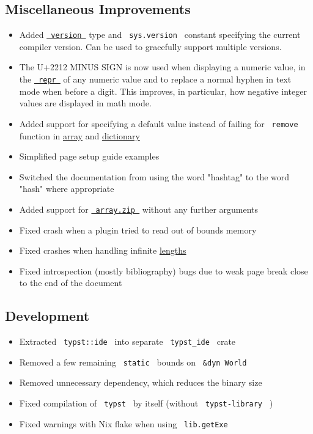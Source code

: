 \subsection{Miscellaneous
Improvements}\label{miscellaneous-improvements}

\begin{itemize}
\tightlist
\item
  Added
  \href{/docs/reference/foundations/version/}{\texttt{\ version\ }} type
  and \texttt{\ sys.version\ } constant specifying the current compiler
  version. Can be used to gracefully support multiple versions.
\item
  The U+2212 MINUS SIGN is now used when displaying a numeric value, in
  the \href{/docs/reference/foundations/repr/}{\texttt{\ repr\ }} of any
  numeric value and to replace a normal hyphen in text mode when before
  a digit. This improves, in particular, how negative integer values are
  displayed in math mode.
\item
  Added support for specifying a default value instead of failing for
  \texttt{\ remove\ } function in
  \href{/docs/reference/foundations/array/\#definitions-remove}{array}
  and
  \href{/docs/reference/foundations/dictionary/\#definitions-remove}{dictionary}
\item
  Simplified page setup guide examples
\item
  Switched the documentation from using the word "hashtag" to the word
  "hash" where appropriate
\item
  Added support for
  \href{/docs/reference/foundations/array/\#definitions-zip}{\texttt{\ array.zip\ }}
  without any further arguments
\item
  Fixed crash when a plugin tried to read out of bounds memory
\item
  Fixed crashes when handling infinite
  \href{/docs/reference/layout/length/}{lengths}
\item
  Fixed introspection (mostly bibliography) bugs due to weak page break
  close to the end of the document
\end{itemize}

\subsection{Development}\label{development}

\begin{itemize}
\tightlist
\item
  Extracted \texttt{\ typst::ide\ } into separate
  \texttt{\ typst\_ide\ } crate
\item
  Removed a few remaining \texttt{\ \textquotesingle{}static\ } bounds
  on \texttt{\ \&dyn\ World\ }
\item
  Removed unnecessary dependency, which reduces the binary size
\item
  Fixed compilation of \texttt{\ typst\ } by itself (without
  \texttt{\ typst-library\ } )
\item
  Fixed warnings with Nix flake when using \texttt{\ lib.getExe\ }
\end{itemize}

